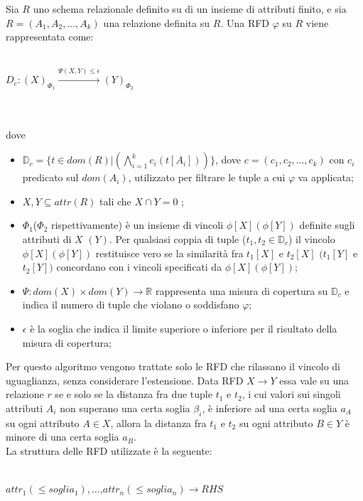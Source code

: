 \begin{theorem}
	Sia $R$ uno schema relazionale definito su di un insieme di attributi finito, e sia $R=(A_1,A_2,...,A_k)$ una relazione definita su $R$. Una RFD $\varphi$ su $R$ viene rappresentata come:
	\\~\\
	\centerline{$D_{c} :(X)_{\Phi_1} \xrightarrow{\Psi(X,Y)\leq\epsilon}(Y)_{\Phi_2}$}
	\\~\\
	dove 
	\begin{itemize}
		\item $\mathbb{D}_{c} = \{t\in dom(R)|(\bigwedge_{i=1}^{k} c_{i}(t[A_i]))\} $, dove $c=(c_1,c_2,...,c_k)$ con $c_i$  predicato sul $dom(A_i)$, utilizzato per filtrare le tuple a cui $\varphi$ va applicata;
		\item $X,Y \subseteq attr(R)$ tali che $X\cap Y=0$ ;
		\item $\Phi_1$($\Phi_2$ rispettivamente) è un insieme di vincoli $\phi[X](\phi[Y])$ definite sugli attributi di $X$ $(Y)$. Per qualsiasi coppia di tuple ($t_1,t_2 \in \mathbb{D}_{c}$) il vincolo $\phi[X](\phi[Y])$ restituisce vero se la similarità fra $t_1[X]$ e $t_2[X]$ $(t_1[Y]$ e $t_2[Y])$ concordano con i vincoli specificati da $\phi[X](\phi[Y])$;
		\item $\Psi: dom(X) \times dom(Y)\xrightarrow{}\mathbb{R}$ rappresenta una misura di copertura su $\mathbb{D}_{c}$ e indica il numero di tuple che violano o soddisfano $\varphi$;
		\item $\epsilon$ è la soglia che indica il limite superiore o inferiore per il risultato della misura di copertura;
	\end{itemize}
\end{theorem}
Per questo algoritmo vengono trattate solo le RFD che rilassano il vincolo di uguaglianza, senza considerare l'estensione. Data RFD $X \xrightarrow{} Y$ essa vale su una relazione $r$ se e solo se la distanza fra due tuple $t_1$ e $t_2$, i cui valori sui singoli attributi $A_i$ non superano una certa soglia $\beta_i$, è inferiore ad una certa soglia $a_A$ su ogni attributo $A \in X$, allora la distanza fra $t_1$ e $t_2$ su ogni attributo $B \in Y$ è minore di una certa soglia $a_B$.\\
La struttura delle RFD utilizzate è la seguente:
\\~\\
\centerline{$attr_1(\leq soglia_1),\ldots$,$attr_n(\leq soglia_n) \xrightarrow{} RHS$}
\\~\\
